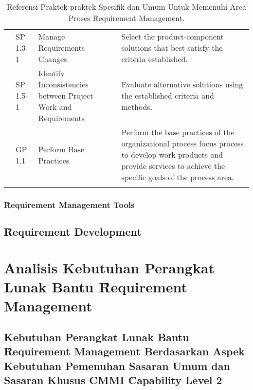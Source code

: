 \begin{center}
\begin{longtable}{|p{2cm}|p{2cm}|p{2.5cm}|p{5cm}|}
& SP 1.3-1 & Manage Requirements Changes & Select the product-component solutions that best satisfy the criteria established.\\ \cline{2-4}
& SP 1.5-1 & Identify Inconsistencies between Project Work and Requirements & Evaluate alternative solutions using the established criteria and methods.\\ \cline{2-4}
& GP 1.1 & Perform Base Practices & Perform the base practices of the organizational process focus process to develop work products and provide services to achieve the specific goals of the process area.\\ \cline{2-4} \hline
\caption[Referensi Praktek-praktek Spesifik dan Umum Untuk Memenuhi Area Proses Requirement Management]{Referensi Praktek-praktek Spesifik dan Umum Untuk Memenuhi Area Proses \f{Requirement Management}.\cite{reqm.cmmiforswcontinous}}  \label{tabel.mappingpractices}\\
\end{longtable}
\end{center}

\subsubsection{\f{Requirement Management Tools}}

\subsection{\f{Requirement Development}}

\section{Analisis Kebutuhan Perangkat Lunak Bantu \f{Requirement Management}}

\subsection{Kebutuhan Perangkat Lunak Bantu \f{Requirement Management} Berdasarkan Aspek Kebutuhan Pemenuhan Sasaran Umum dan Sasaran Khusus CMMI \f{Capability Level} 2}


